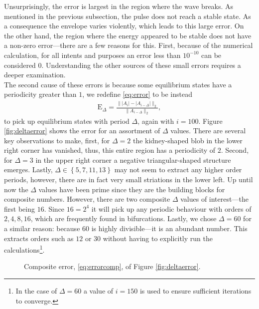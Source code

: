 Unsurprisingly, the error is largest in the region where the wave breaks. As mentioned in the previous subsection, the pulse does not reach a stable state. As a consequence the envelope varies violently, which leads to this large error. On the other hand, the region where the energy appeared to be stable does not have a non-zero error---there are a few reasons for this. First, because of the numerical calculation, for all intents and purposes an error less than $10^{-10}$ can be considered $0$. Understanding the other sources of these small errors requires a deeper examination. \\

The second cause of these errors is because some equilibrium states have a periodicity greater than $1$, we redefine \eqref{eq:error} to be instead
\begin{align}
\textrm{E}_\Delta = \frac{\| |A_i| - |A_{i-\Delta}| \|_2}{\| A_{i-\Delta} \|_2},
\label{eq:deltaerror}
\end{align}
to pick up equilibrium states with period $\Delta$, again with $i = 100$. Figure \ref{fig:deltaerror} shows the error for an assortment of $\Delta$ values. There are several key observations to make, first, for $\Delta = 2$ the kidney-shaped blob in the lower right corner has vanished, thus, this entire region has a periodicity of $2$. Second, for $\Delta = 3$ in the upper right corner a negative triangular-shaped structure emerges. Lastly, $\Delta \in \left\{ 5, 7, 11, 13 \right\}$ may not seem to extract any higher order periods, however, there are in fact very small striations in the lower left. Up until now the $\Delta$ values have been prime since they are the building blocks for composite numbers. However, there are two composite $\Delta$ values of interest---the first being $16$. Since $16 = 2^4$ it will pick up any periodic behaviour with orders of $2, 4, 8, 16$, which are frequently found in bifurcations. Lastly, we chose $\Delta = 60$ for a similar reason: because $60$ is highly divisible---it is an abundant number. This extracts orders such as $12$ or $30$ without having to explicitly run the calculations\footnote{In the case of $\Delta = 60$ a value of $i = 150$ is used to ensure sufficient iterations to converge.}. \\

\begin{figure}[tbp]

\caption{Composite error, \eqref{eq:errorcomp}, of Figure \ref{fig:deltaerror}.}
\label{fig:errorcomp}
\end{figure}

